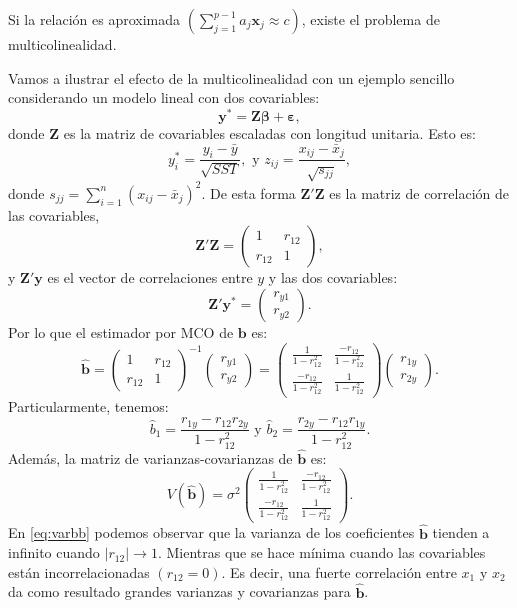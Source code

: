 \documentclass[
]{article}
\begin{document}
Si la relación es aproximada \((\sum_{j=1}^{p-1}a_{j}\boldsymbol x_{j} \approx c)\), existe el problema de multicolinealidad.

Vamos a ilustrar el efecto de la multicolinealidad con un ejemplo sencillo considerando un modelo lineal con dos covariables:
\[
\boldsymbol y^{*} = \boldsymbol Z\boldsymbol \beta+ \boldsymbol \varepsilon,
\]
donde \(\boldsymbol Z\) es la matriz de covariables escaladas con longitud unitaria. Esto es:
\[
y_{i}^{*} = \frac{y_{i}-\bar{y}}{\sqrt{SST}}, \mbox{ y } z_{ij} = \frac{x_{ij} - \bar{x}_{j}}{\sqrt{s_{jj}}},
\]
donde \(s_{jj} = \sum_{i=1}^{n}(x_{ij}-\bar{x}_{j})^{2}\). De esta forma \(\boldsymbol Z'\boldsymbol Z\) es la matriz de correlación de las covariables,
\[
\boldsymbol Z'\boldsymbol Z= \begin{pmatrix}
1 & r_{12} \\ r_{12} & 1
\end{pmatrix},
\]
y \(\boldsymbol Z'\boldsymbol y\) es el vector de correlaciones entre \(y\) y las dos covariables:
\[
\boldsymbol Z'\boldsymbol y^{*} = \begin{pmatrix}
r_{y1} \\ r_{y2}
\end{pmatrix}.
\]
Por lo que el estimador por MCO de \(\boldsymbol b\) es:
\[
\widehat{\boldsymbol b}= \begin{pmatrix}
1 & r_{12} \\ r_{12} & 1
\end{pmatrix}^{-1}\begin{pmatrix}
r_{y1} \\ r_{y2}
\end{pmatrix} = \begin{pmatrix}
\frac{1}{1-r_{12}^{2}} & \frac{-r_{12}}{1-r_{12}^{2}} \\ \frac{-r_{12}}{1-r_{12}^{2}} & \frac{1}{1-r_{12}^{2}} \end{pmatrix} \begin{pmatrix}
r_{1y} \\ r_{2y}
\end{pmatrix}.
\]
Particularmente, tenemos:
\[
\widehat{b}_{1} = \frac{r_{1y}-r_{12}r_{2y}}{1-r_{12}^{2}} \mbox{ y } \widehat{b}_{2} = \frac{r_{2y}-r_{12}r_{1y}}{1-r_{12}^{2}}.
\]
Además, la matriz de varianzas-covarianzas de \(\widehat{\boldsymbol b}\) es:
\begin{equation}
V(\widehat{\boldsymbol b}) = \sigma^{2} \begin{pmatrix}
\frac{1}{1-r_{12}^{2}} & \frac{-r_{12}}{1-r_{12}^{2}} \\ \frac{-r_{12}}{1-r_{12}^{2}} & \frac{1}{1-r_{12}^{2}} \end{pmatrix}.
\label{eq:varbb}
\end{equation}
En \eqref{eq:varbb} podemos observar que la varianza de los coeficientes \(\widehat{\boldsymbol b}\) tienden a infinito cuando \(|r_{12}|\rightarrow 1\). Mientras que se hace mínima cuando las covariables están incorrelacionadas \((r_{12}=0)\). Es decir, una fuerte correlación entre \(x_1\) y \(x_2\) da como resultado grandes varianzas y covarianzas para \(\widehat{\boldsymbol b}\).
\end{document}
